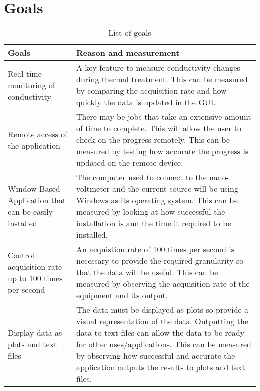 \documentclass[12pt, titlepage]{article}
\begin{document}
\section{Goals}
\begin{table}[h!]
    \centering
    \begin{tabular}{p{} p{}}
    
    \toprule
    \textbf{Goals} & \textbf{Reason and measurement}\\
   
    \midrule{Real-time monitoring of conductivity} & A key feature to measure conductivity changes during thermal treatment. This can be measured by comparing the acquisition rate and how quickly the data is updated in the GUI. \\
    \midrule{Remote access of the application} & There may be jobs that take an extensive amount of time to complete. This will allow the user to check on the progress remotely. This can be measured by testing how accurate the progress is updated on the remote device. \\
    \midrule{Window Based Application that can be easily installed} & The computer used to connect to the nano-voltmeter and the current source will be using Windows as its operating system. This can be measured by looking at how successful the installation is and the time it required to be installed. \\
    \midrule{Control acquisition rate up to 100 times per second} & An acquistion rate of 100 times per second is necessary to provide the required granularity so that the data will be useful. This can be measured by observing the acquisition rate of the equipment and its output. \\
    \midrule{Display data as plots and text files} & The data must be displayed as plots so provide a visual representation of the data. Outputting the data to text files can allow the data to be ready for other uses/applications. This can be measured by observing how successful and accurate the application outputs the results to plots and text files. \\
    
    \bottomrule
    
    \end{tabular}
    \caption{List of goals}
\end{table}


\newpage
\end{document}
